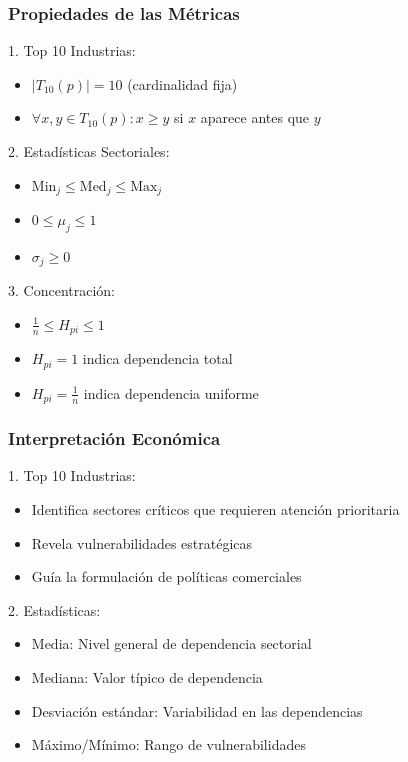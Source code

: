 \documentclass[11pt,a4paper]{article}
\begin{document}
\subsubsection{Propiedades de las Métricas}

1. Top 10 Industrias:
\begin{itemize}
    \item $|T_{10}(p)| = 10$ (cardinalidad fija)
    \item $\forall x,y \in T_{10}(p): x \geq y$ si $x$ aparece antes que $y$
\end{itemize}

2. Estadísticas Sectoriales:
\begin{itemize}
    \item $\text{Min}_j \leq \text{Med}_j \leq \text{Max}_j$
    \item $0 \leq \mu_j \leq 1$
    \item $\sigma_j \geq 0$
\end{itemize}

3. Concentración:
\begin{itemize}
    \item $\frac{1}{n} \leq H_{pi} \leq 1$
    \item $H_{pi} = 1$ indica dependencia total
    \item $H_{pi} = \frac{1}{n}$ indica dependencia uniforme
\end{itemize}

\subsubsection{Interpretación Económica}

1. Top 10 Industrias:
\begin{itemize}
    \item Identifica sectores críticos que requieren atención prioritaria
    \item Revela vulnerabilidades estratégicas
    \item Guía la formulación de políticas comerciales
\end{itemize}

2. Estadísticas:
\begin{itemize}
    \item Media: Nivel general de dependencia sectorial
    \item Mediana: Valor típico de dependencia
    \item Desviación estándar: Variabilidad en las dependencias
    \item Máximo/Mínimo: Rango de vulnerabilidades
\end{itemize}
\end{document}
